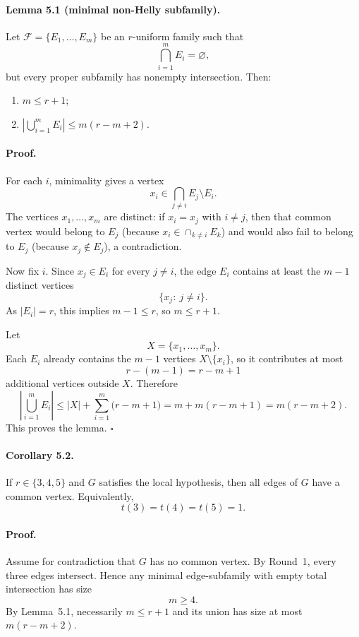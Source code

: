 \paragraph{Lemma 5.1 (minimal non-Helly subfamily).}
Let $\mathcal{F}=\{E_1,\dots,E_m\}$ be an $r$-uniform family such that
\[
\bigcap_{i=1}^m E_i=\varnothing,
\]
but every proper subfamily has nonempty intersection. Then:

\begin{enumerate}
\item $m\le r+1$;
\item $\left|\bigcup_{i=1}^m E_i\right|\le m(r-m+2)$.
\end{enumerate}

\paragraph{Proof.}
For each $i$, minimality gives a vertex
\[
x_i\in \bigcap_{j\ne i} E_j\setminus E_i.
\]
The vertices $x_1,\dots,x_m$ are distinct: if $x_i=x_j$ with $i\ne j$, then that common vertex would belong to $E_j$ (because $x_i\in \cap_{k\ne i} E_k$) and would also fail to belong to $E_j$ (because $x_j\notin E_j$), a contradiction.

Now fix $i$. Since $x_j\in E_i$ for every $j\ne i$, the edge $E_i$ contains at least the $m-1$ distinct vertices
\[
\{x_j:\ j\ne i\}.
\]
As $|E_i|=r$, this implies $m-1\le r$, so $m\le r+1$.

Let
\[
X=\{x_1,\dots,x_m\}.
\]
Each $E_i$ already contains the $m-1$ vertices $X\setminus\{x_i\}$, so it contributes at most
\[
r-(m-1)=r-m+1
\]
additional vertices outside $X$. Therefore
\[
\left|\bigcup_{i=1}^m E_i\right|
\le |X|+\sum_{i=1}^m \bigl(r-m+1\bigr)
= m+m(r-m+1)
= m(r-m+2).
\]
This proves the lemma.
\hfill $\square$

\paragraph{Corollary 5.2.}
If $r\in\{3,4,5\}$ and $G$ satisfies the local hypothesis, then all edges of $G$ have a common vertex. Equivalently,
\[
t(3)=t(4)=t(5)=1.
\]

\paragraph{Proof.}
Assume for contradiction that $G$ has no common vertex. By Round~1, every three edges intersect. Hence any minimal edge-subfamily with empty total intersection has size
\[
m\ge 4.
\]
By Lemma~5.1, necessarily $m\le r+1$ and its union has size at most $m(r-m+2)$.

